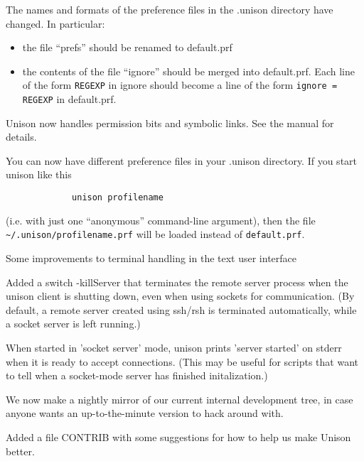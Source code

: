 \begin{changesfromversion}{1.111}
\item \incompatible{} The names and formats of the preference files in
the .unison directory have changed.  In particular:
\begin{itemize}
\item the file ``prefs'' should be renamed to default.prf
\item the contents of the file ``ignore'' should be merged into
  default.prf.  Each line of the form \verb|REGEXP| in ignore should
  become a line of the form \verb|ignore = REGEXP| in default.prf.
\end{itemize}
\item Unison now handles permission bits and  symbolic links.  See the
manual for details.

\item You can now have different preference files in your .unison
directory.  If you start unison like this
\begin{verbatim}
             unison profilename
\end{verbatim}
(i.e. with just one ``anonymous'' command-line argument), then the
file \verb|~/.unison/profilename.prf| will be loaded instead of
\verb|default.prf|. 

\item Some improvements to terminal handling in the text user interface

\item Added a switch -killServer that terminates the remote server process
when the unison client is shutting down, even when using sockets for 
communication.  (By default, a remote server created using ssh/rsh is 
terminated automatically, while a socket server is left running.)
\item When started in 'socket server' mode, unison prints 'server started' on
  stderr when it is ready to accept connections.  
  (This may be useful for scripts that want to tell when a socket-mode server 
  has finished initalization.)
\item We now make a nightly mirror of our current internal development
  tree, in case anyone wants an up-to-the-minute version to hack
  around with.
\item Added a file CONTRIB with some suggestions for how to help us
make Unison better.
\end{changesfromversion}


